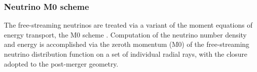










\subsubsection{Neutrino M0 scheme}


The free-streaming neutrinos are treated via a variant of the moment equations of energy transport, 
the M0 scheme \citep{Radice:2016dwd,Radice:2018pdn}.
Computation of the neutrino number density and energy is 
accomplished via the zeroth momentum (M0) of the free-streaming neutrino distribution 
function on a set of individual radial rays, with the closure adopted to the post-merger geometry.


